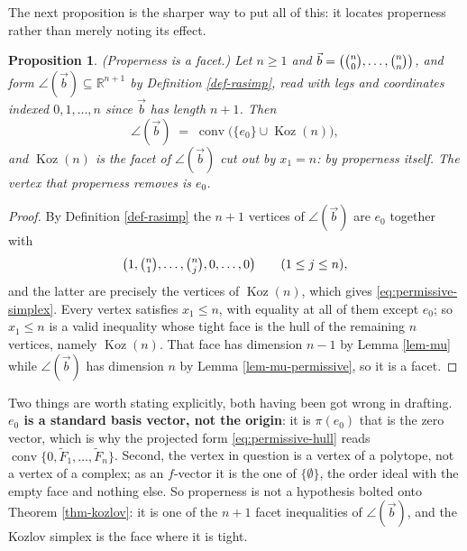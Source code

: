 \documentclass[11pt, a4paper, abstract=yes]{scrartcl}
\theoremstyle{definition}
\theoremstyle{remark}
\theoremstyle{plain}
\newtheorem{proposition}[definition]{Proposition}
\newcommand{\Koz}{\operatorname{Koz}}
\newcommand{\rasimp}{\angle}
\newcommand{\proj}{\pi}
\newcommand{\leanpartial}{\tikz[baseline=-0.6ex]{\fill[leanfull] (0,-0.6ex) arc (-90:90:0.6ex) -- cycle;\draw[leanfull,line width=0.5pt] (0,0) circle (0.6ex);}}
\newcommand{\leanmark}[1]{\leavevmode{\reversemarginpar\marginnote{\raggedleft#1}}}
\newcommand{\conv}{\operatorname{conv}}
\begin{document}
The next proposition is the sharper way to put all of this: it locates properness rather than merely
noting its effect.

\begin{proposition}
\leanmark{\leanpartial}(\emph{Properness is a facet.}) Let \(n\ge1\) and \(\vec b=\bigl(\tbinom n0,\dots,\tbinom nn\bigr)\), and
form \(\rasimp(\vec b)\subseteq\mathbb R^{n+1}\) by Definition \ref{def-rasimp}, read with legs and
coordinates indexed \(0,1,\dots,n\) since \(\vec b\) has length \(n+1\). Then
\begin{equation}\label{eq:permissive-simplex}
  \rasimp(\vec b)\;=\;\conv\bigl(\lbrace e_0\rbrace\cup\Koz(n)\bigr),
\end{equation}
and \(\Koz(n)\) is the facet of \(\rasimp(\vec b)\) cut out by \(x_1=n\): by properness
itself. The vertex that properness removes is \(e_0\).
\label{prop:properness-facet}
\label{prop-properness-facet}
\end{proposition}

\begin{proof}
By Definition \ref{def-rasimp} the \(n+1\) vertices of \(\rasimp(\vec b)\) are \(e_0\) together with
\begin{equation}\label{eq:permissive-verts}
  \bigl(1,\tbinom n1,\dots,\tbinom nj,0,\dots,0\bigr)\qquad(1\le j\le n),
\end{equation}
and the latter are precisely the vertices of \(\Koz(n)\), which gives
\eqref{eq:permissive-simplex}. Every vertex
satisfies \(x_1\le n\), with equality at all of them except \(e_0\); so \(x_1\le n\) is a valid
inequality whose tight face is the hull of the remaining \(n\) vertices, namely \(\Koz(n)\). That face
has dimension \(n-1\) by Lemma \ref{lem-mu} while \(\rasimp(\vec b)\) has dimension \(n\) by
Lemma \ref{lem-mu-permissive}, so it is a facet.
\end{proof}

Two things are worth stating explicitly, both having been got wrong in drafting. \textbf{\textbf{\(e_0\) is a
standard basis vector, not the origin}}: it is \(\proj(e_0)\) that is the zero vector, which is why the
projected form \eqref{eq:permissive-hull} reads \(\conv\lbrace0,\tilde F_1,\dots,\tilde F_n\rbrace\).
Second, the vertex in question is a vertex of a polytope, not a vertex of a complex; as an \(f\)-vector it
is the one of \(\lbrace\emptyset\rbrace\), the order ideal with the empty face and nothing else. So
properness is not a hypothesis bolted onto Theorem \ref{thm-kozlov}: it is one of the \(n+1\) facet
inequalities of \(\rasimp(\vec b)\), and the Kozlov simplex is the face where it is tight.
\end{document}
